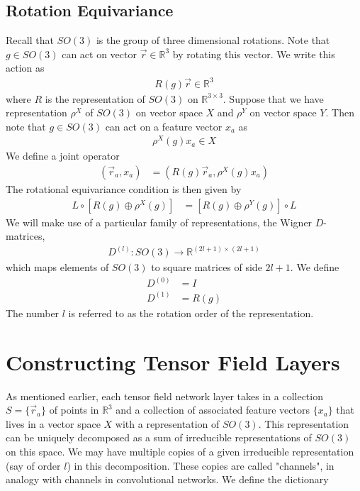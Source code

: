 \documentclass[book.tex]{subfiles}
\begin{document}
\subsection{Rotation Equivariance}
Recall that $SO(3)$ is the group of three dimensional rotations. Note that $g \in SO(3)$ can act on vector $\vec{r} \in \mathbb{R}^3$ by rotating this vector. We write this action as
\begin{align}
    R(g)\vec{r} \in \mathbb{R}^3
\end{align}
where $R$ is the representation of $SO(3)$ on $\mathbb{R}^{3 \times 3}$. Suppose that we have representation $\rho^X$ of $SO(3)$ on vector space $X$ and $\rho^Y$ on vector space $Y$. Then note that $g \in SO(3)$ can act on a feature vector $x_a$ as
\begin{align}
    \rho^X(g)x_a \in X
\end{align}
We define a joint operator
\begin{align}
    [R(g) \oplus \rho^X(g)](\vec{r}_a, x_a) &= (R(g)\vec{r}_a, \rho^X(g)x_a)
\end{align}
The rotational equivariance condition is then given by
\begin{align}
    L \circ [R(g) \oplus \rho^X(g)] &= [R(g) \oplus \rho^Y(g)] \circ L
\end{align}
We will make use of a particular family of representations, the Wigner $D$-matrices, 
\begin{align}
    D^{(l)}: SO(3) \to \mathbb{R}^{(2l+1)\times(2l+1)}
\end{align}
which maps elements of $SO(3)$ to square matrices of side $2l+1$. We define
\begin{align}
    D^{(0)} &= I \\
    D^{(1)} &= R(g)
\end{align}
The number $l$ is referred to as the rotation order of the representation.

\section{Constructing Tensor Field Layers}

As mentioned earlier, each tensor field network layer takes in a collection $S = \{\vec{r}_a\}$ of points in $\mathbb{R}^3$ and a collection of associated feature vectors $\{x_a\}$ that lives in a vector space $X$ with a representation of $SO(3)$. This representation can be uniquely decomposed as a sum of irreducible representations of $SO(3)$ on this space. We may have multiple copies of a given irreducible representation (say of order $l$) in this decomposition. These copies are called "channels", in analogy with channels in convolutional networks. We define the dictionary
\end{document}
